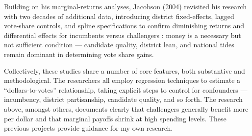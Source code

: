 \indent Building on his marginal-returns analyses, Jacobson (2004) revisited his research with two decades of additional data, introducing district fixed-effects, lagged vote-share controls, and spline specifications to confirm diminishing returns and differential effects for incumbents versus challengers \cite{jacobson2004}: money is a necessary but not sufficient condition --- candidate quality, district lean, and national tides remain dominant in determining vote share gains.

\indent Collectively, these studies share a number of core features, both substantive and meth\-o\-do\-log\-i\-cal. The researchers all employ regression techniques to estimate a ``dollars-to-votes'' relationship, taking explicit steps to control for confounders --- incumbency, district partisanship, candidate quality, and so forth. The research above, amongst others, documents clearly that challengers generally benefit more per dollar and that marginal payoffs shrink at high spending levels. These previous projects provide guidance for my own research.
